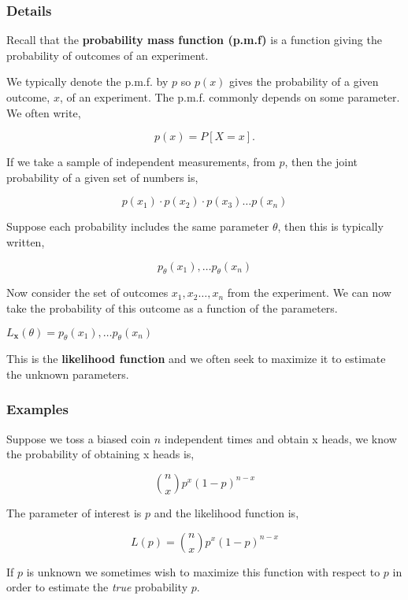 \documentclass[12pt,a4paper]{article}
\theoremstyle{regla}
\theoremstyle{remark}
\theoremstyle{definition}
\theoremstyle{nonumberbreak}
\begin{document}
\subsubsection{Details}
\begin{defn}
Recall that the {\bf probability mass function (p.m.f)} is a function giving the probability of outcomes of an experiment.
\end{defn}
We typically denote the p.m.f. by $p$ so $p(x)$ gives the probability of a given outcome, $x$, of an experiment. The p.m.f.  commonly depends on some parameter. We often write,

$$ p(x) = P [X = x].$$

If we take a sample of independent measurements, from $p$, then the joint probability of a given set of numbers is, 

$$ p(x_1) \cdot p(x_2) \cdot p(x_3) \ldots p(x_n)$$

 

Suppose each probability includes the same parameter $\theta$, then this is typically written,

$$ {p_{\theta}}(x_1),  \ldots {p_{\theta}}(x_n)$$

 

Now consider the set of outcomes $ x_1, x_2 \ldots, x_n$ from the experiment. We can now take the probability of this outcome as a function of the parameters.
\begin{defn}
$ L_{\mathbf{x}}(\theta) = p_{\theta}(x_1),  \ldots p_{\theta}(x_n)$ 

This is the \textbf{likelihood function} and we often seek to maximize it to estimate the unknown parameters.
\end{defn}
\subsubsection{Examples}
\begin{xmpl}
Suppose we toss a biased coin $n$ independent times and obtain x heads, we know the probability of obtaining x heads is,

$$\binom{n}{x}p^x (1-p)^{n-x}$$

The parameter of interest is $p$ and the likelihood function is,

$$ L(p) = \binom{n}{x}p^x (1-p)^{n-x}$$

If $p$ is unknown we sometimes wish to maximize this function with respect to $p$ in order to estimate the \emph{true} probability $p$.
\end{xmpl}
\end{document}
